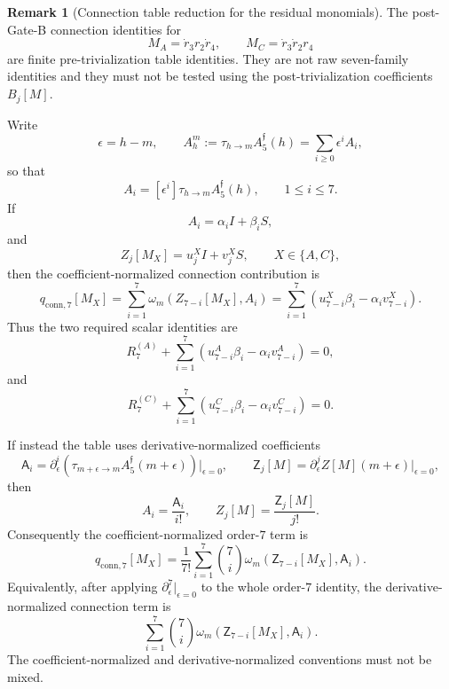 \documentclass[11pt,a4paper]{amsart}
\theoremstyle{plain}
\theoremstyle{definition}
\newtheorem{remark}[theorem]{Remark}
\begin{document}
\begin{remark}[Connection table reduction for the residual monomials]
\label{rem:connection-table-reduction-residual-monomials}
The post-Gate-B connection identities for
\[
M_A=\dot r_3r_2\dot r_4,
\qquad
M_C=\dot r_3\dot r_2r_4
\]
are finite pre-trivialization table identities.  They are not raw
seven-family identities and they must not be tested using the
post-trivialization coefficients \(B_j[M]\).

Write
\[
\epsilon=h-m,
\qquad
A_h^m:=\tau_{h\to m}A_5^{\mathfrak f}(h)
       =\sum_{i\ge0}\epsilon^iA_i,
\]
so that
\[
A_i=[\epsilon^i]\tau_{h\to m}A_5^{\mathfrak f}(h),
\qquad 1\le i\le7.
\]
If
\[
A_i=\alpha_i I+\beta_iS,
\]
and
\[
Z_j[M_X]=u_j^X I+v_j^X S,
\qquad X\in\{A,C\},
\]
then the coefficient-normalized connection contribution is
\[
q_{\mathrm{conn},7}[M_X]
=
\sum_{i=1}^{7}
\omega_m(Z_{7-i}[M_X],A_i)
=
\sum_{i=1}^{7}
\left(
u_{7-i}^X\beta_i-\alpha_i v_{7-i}^X
\right).
\]
Thus the two required scalar identities are
\[
R_7^{(A)}
+
\sum_{i=1}^{7}
\left(
u_{7-i}^A\beta_i-\alpha_i v_{7-i}^A
\right)
=0,
\]
and
\[
R_7^{(C)}
+
\sum_{i=1}^{7}
\left(
u_{7-i}^C\beta_i-\alpha_i v_{7-i}^C
\right)
=0.
\]

If instead the table uses derivative-normalized coefficients
\[
\mathsf A_i
=
\partial_\epsilon^i
\left(\tau_{m+\epsilon\to m}A_5^{\mathfrak f}(m+\epsilon)\right)
\big|_{\epsilon=0},
\qquad
\mathsf Z_j[M]
=
\partial_\epsilon^j Z[M](m+\epsilon)\big|_{\epsilon=0},
\]
then
\[
A_i=\frac{\mathsf A_i}{i!},
\qquad
Z_j[M]=\frac{\mathsf Z_j[M]}{j!}.
\]
Consequently the coefficient-normalized order-\(7\) term is
\[
q_{\mathrm{conn},7}[M_X]
=
\frac{1}{7!}
\sum_{i=1}^{7}
\binom{7}{i}
\omega_m(\mathsf Z_{7-i}[M_X],\mathsf A_i).
\]
Equivalently, after applying \(\partial_\epsilon^7|_{\epsilon=0}\) to the
whole order-\(7\) identity, the derivative-normalized connection term is
\[
\sum_{i=1}^{7}
\binom{7}{i}
\omega_m(\mathsf Z_{7-i}[M_X],\mathsf A_i).
\]
The coefficient-normalized and derivative-normalized conventions must not be
mixed.
\end{remark}
\end{document}
